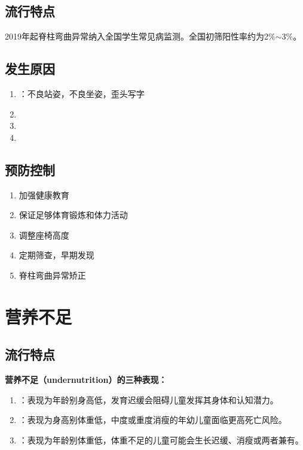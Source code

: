 \subsection{流行特点}

\begin{keybox}
2019年起脊柱弯曲异常纳入全国学生常见病监测。全国初筛阳性率约为2\%$\sim$3\%。
\end{keybox}

\subsection{发生原因}

\begin{keybox}
\begin{enumerate}[leftmargin=*]
    \item {}：不良站姿，不良坐姿，歪头写字
    \item {}
    \item {}
    \item {}
\end{enumerate}
\end{keybox}

\subsection{预防控制}

\begin{keybox}
\begin{enumerate}[leftmargin=*]
    \item 加强健康教育
    \item 保证足够体育锻炼和体力活动
    \item 调整座椅高度
    \item 定期筛查，早期发现
    \item 脊柱弯曲异常矫正
\end{enumerate}
\end{keybox}

\section{营养不足}

\subsection{流行特点}

\begin{defbox}
\textbf{营养不足（undernutrition）的三种表现：}

\begin{enumerate}[leftmargin=*]
    \item {}：表现为年龄别身高低，发育迟缓会阻碍儿童发挥其身体和认知潜力。
    \item {}：表现为身高别体重低，中度或重度消瘦的年幼儿童面临更高死亡风险。
    \item {}：表现为年龄别体重低，体重不足的儿童可能会生长迟缓、消瘦或两者兼有。
\end{enumerate}
\end{defbox}

